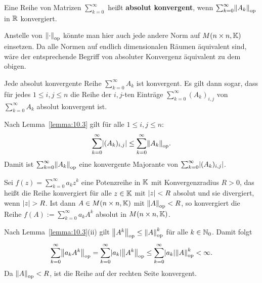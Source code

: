\begin{definition}
	\label{def:10.4}
	Eine Reihe von Matrizen $\sum_{k=0}^{\infty}$ heißt \textbf{absolut konvergent}, wenn $\sum_{k=0}^{\infty} \opn{A_k}$ in $\mathbb{R}$ konvergiert. 
\end{definition}

\begin{bemerkung}
	\label{bem:10.5}
	Anstelle von $\left\lVert\cdot\right\rVert_{\text{op}}$ könnte man hier auch jede andere Norm auf $M(n \times n, \mathbb{K})$ einsetzen.
	Da alle Normen auf endlich dimensionalen Räumen äquivalent sind, wäre der entsprechende Begriff von absoluter Konvergenz äquivalent zu dem obigen.
\end{bemerkung}

\begin{satz}
	\label{satz:10.6}
	Jede absolut konvergente Reihe $\sum_{k=0}^{\infty} A_k$ ist konvergent.
	Es gilt dann sogar, dass für jedes $1 \leq i,j \leq n$ die Reihe der $i,j$-ten Einträge $\sum_{k=0}^{\infty} (A_k)_{i,j}$ von $\sum_{k=0}^{\infty} A_k$ absolut konvergent ist.
\end{satz}

\begin{beweis}
	Nach Lemma~\ref{lemma:10.3} gilt für alle $1 \leq i,j \leq n$:
	\[
		\sum_{k=0}^{\infty} \abs{(A_k)_{i,j}} \leq \sum_{k=0}^{\infty} \opn{A_k}.
	\]
	Damit ist $\sum_{k=0}^{\infty} \opn{A_k}$ eine konvergente Majorante von $\sum_{k=0}^{\infty} \abs{(A_k)_{i,j}}$.	
\end{beweis}

\begin{korollar}
	\label{kor:10.7}
	Sei $f(z) = \sum_{k=0}^{\infty} a_kz^k$ eine Potenzreihe in $\mathbb{K}$ mit Konvergenzradius $R > 0$, das heißt die Reihe konvergiert für alle $z \in \mathbb{K}$ mit $\left\lvert z\right\rvert < R$ absolut und sie divergiert, wenn $\left\lvert z\right\rvert > R$. 
	Ist dann $A \in M(n \times n,\mathbb{K})$ mit $\left\lVert A\right\rVert_{\text{op}} < R$, so konvergiert die Reihe $f(A) := \sum_{k=0}^{\infty} a_k A^k$ absolut in $M(n \times n,\mathbb{K})$.
\end{korollar}

\begin{beweis}
	Nach Lemma~\ref{lemma:10.3}(ii) gilt $\left\lVert A^k\right\rVert_{\text{op}} \leq \left\lVert A\right\rVert_{\text{op}}^k$ für alle $k \in \mathbb{N}_0$.
	Damit folgt
	\[
		\sum_{k=0}^{\infty} \opn{a_k A^k} = \sum_{k=0}^{\infty} \abs{a_k} \opn{A^k} \leq \sum_{k=0}^{\infty} \abs{a_k} \opn{A}^k < \infty.
	\]
	Da $\left\lVert A\right\rVert_{\text{op}} < R$, ist die Reihe auf der rechten Seite konvergent. 
\end{beweis}

